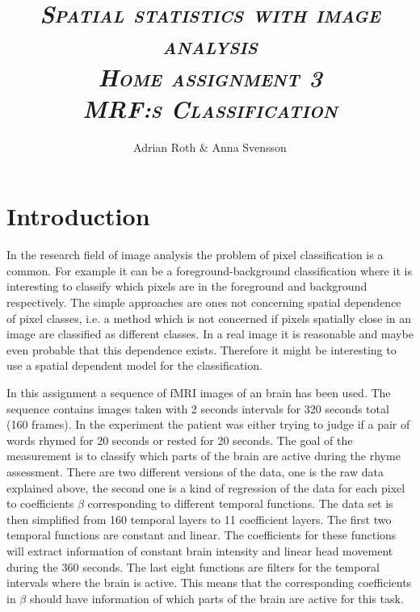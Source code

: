 \documentclass[a4paper,english]{article}
\begin{document}
\afterpage{\cfoot{\thepage}}

\title{\textit{{\textbf{\textsc{Spatial statistics with image analysis  \\ Home assignment 3 \\  MRF:s Classification}}}}}

\author{Adrian Roth \& Anna Svensson}

\maketitle
\thispagestyle{empty}



\pagebreak{}

\thispagestyle{empty}

\pagebreak{}

\section{Introduction}
In the research field of image analysis the problem of pixel classification is a common.
For example it can be a foreground-background classification where it is interesting to classify which pixels are in the foreground and background respectively.
The simple approaches are ones not concerning spatial dependence of pixel classes, i.e. a method which is not concerned if pixels spatially close in an image are classified as different classes.
In a real image it is reasonable and maybe even probable that this dependence exists.
Therefore it might be interesting to use a spatial dependent model for the classification.

In this assignment a sequence of fMRI images of an brain has been used.
The sequence contains images taken with 2 seconds intervals for 320 seconds total (160 frames).
In the experiment the patient was either trying to judge if a pair of words rhymed for 20 seconds or rested for 20 seconds.
The goal of the measurement is to classify which parts of the brain are active during the rhyme assessment.
There are two different versions of the data, one is the raw data explained above, the second one is a kind of regression of the data for each pixel to coefficients $\beta$ corresponding to different temporal functions.
The data set is then simplified from 160 temporal layers to 11 coefficient layers.
The first two temporal functions are constant and linear.
The coefficients for these functions will extract information of constant brain intensity and linear head movement during the 360 seconds.
The last eight functions are filters for the temporal intervals where the brain is active.
This means that the corresponding coefficients in $\beta$ should have information of which parts of the brain are active for this task.
\end{document}

